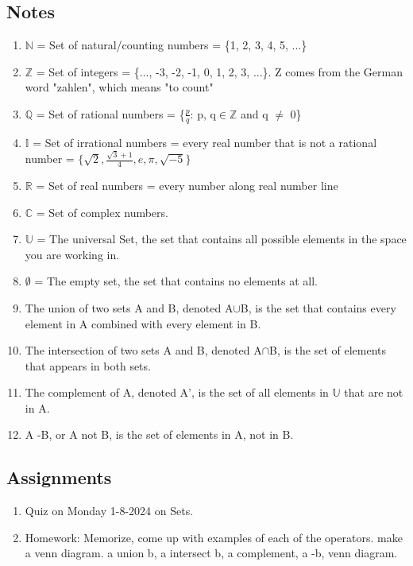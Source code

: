 \documentclass[12pt]{article}
\begin{document}
\subsection{Notes}
\begin{enumerate}

    \item $\mathbb{N}$ = Set of natural/counting numbers = \{1, 2, 3, 4, 5, ...\}
    \item $\mathbb{Z}$ = Set of integers = \{..., -3, -2, -1, 0, 1, 2, 3, ...\}. Z comes from the German word "zahlen", which means "to count"
    \item $\mathbb{Q}$ = Set of rational numbers = \{\(\frac{p}{q}\): p, q\(\in\)$\mathbb{Z}$ and q \(\neq\) 0\}
    \item $\mathbb{I}$ = Set of irrational numbers = every real number that is not a rational number = \(\{\sqrt{2}, \frac{\sqrt{3} + 1}{4}, e, \pi, \sqrt{-5}\}\)
    \item $\mathbb{R}$ = Set of real numbers = every number along real number line
    \item $\mathbb{C}$ = Set of complex numbers.
    \item $\mathbb{U}$ = The universal Set, the set that contains all possible elements in the space you are working in.
    \item $\emptyset$ = The empty set, the set that contains no elements at all.
    \item The union of two sets A and B, denoted A\(\cup\)B, is the set that contains every element in A combined with every element in B.
    \item The intersection of two sets A and B, denoted A\(\cap\)B, is the set of elements that appears in both sets.
    \item The complement of A, denoted A', is the set of all elements in $\mathbb{U}$ that are not in A.
    \item A -B, or A not B, is the set of elements in A, not in B.
    
\end{enumerate}
\subsection{Assignments}
\begin{enumerate}

    \item Quiz on Monday 1-8-2024 on Sets. 
    
    \item Homework: Memorize, come up with examples of each of the operators. make a venn diagram. a union b, a intersect b, a complement, a -b, venn diagram.
    
\end{enumerate}
\end{document}
